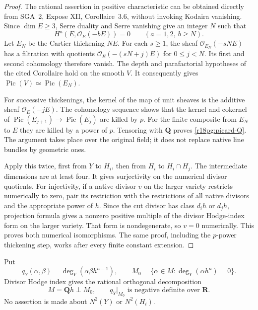 \begin{proof}
The rational assertion in positive characteristic can be obtained
directly from SGA~2, Expose XII, Corollaire~3.6, without invoking
Kodaira vanishing.  Since $\dim E\ge3$, Serre duality and Serre
vanishing give an integer $N$ such that
\[
 H^a(E,\mathcal O_E(-bE))=0\qquad(a=1,2,\ b\ge N).
\]
Let $E_N$ be the Cartier thickening $NE$.  For each $s\ge1$, the
sheaf $\mathcal O_{E_N}(-sNE)$ has a filtration with quotients
$\mathcal O_E(-(sN+j)E)$ for $0\le j<N$.  Its first and second
cohomology therefore vanish.  The depth and parafactorial hypotheses
of the cited Corollaire hold on the smooth $V$.  It consequently gives
$\operatorname{Pic}(V)\simeq\operatorname{Pic}(E_N)$.

For successive thickenings, the kernel of the map of unit sheaves
is the additive sheaf $\mathcal O_E(-jE)$.  The cohomology sequence
shows that the kernel and cokernel of
$\operatorname{Pic}(E_{j+1})\to\operatorname{Pic}(E_j)$ are killed
by $p$.  For the finite composite from $E_N$ to $E$ they are killed
by a power of $p$.  Tensoring with $\mathbf Q$ proves
\eqref{r18pg:picard-Q}.  The argument takes place over the original
field; it does not replace native line bundles by geometric ones.

Apply this twice, first from $Y$ to $H_i$, then from $H_i$ to
$H_i\cap H_j$.  The intermediate dimensions are at least four.
It gives surjectivity on the numerical divisor quotients.  For
injectivity, if a native divisor $v$ on the larger variety restricts
numerically to zero, pair its restriction with the restrictions of
all native divisors and the appropriate power of $h$.  Since the
cut divisor has class $d_i h$ or $d_jh$, projection formula gives
a nonzero positive multiple of the divisor Hodge-index form on the
larger variety.  That form is nondegenerate, so $v=0$ numerically.
This proves both numerical isomorphisms.  The same proof, including
the $p$-power thickening step, works after every finite constant
extension.
\end{proof}

Put
\[
 q_Y(\alpha,\beta)=\deg_Y(\alpha\beta h^{n-1}),\qquad
 M_0=\{\alpha\in M:\deg_Y(\alpha h^n)=0\}.
 \tag{PG18.7}\label{r18pg:ambient-form}
\]
Divisor Hodge index gives the rational orthogonal decomposition
\[
                         M=\mathbf Qh\mathbin{\perp}M_0,
              \qquad q_Y|_{M_0}\text{ is negative definite over }\mathbf R.
 \tag{PG18.8}\label{r18pg:ambient-primitive}
\]
No assertion is made about $N^2(Y)$ or $N^2(H_i)$.


